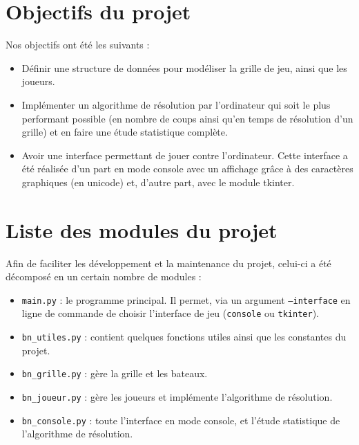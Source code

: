 \section{Objectifs du projet}
Nos objectifs ont été les suivants :
\begin{itemize}
\item Définir une structure de données pour modéliser la grille de jeu, ainsi que les joueurs.
\item Implémenter un algorithme de résolution par l'ordinateur qui soit le plus performant possible (en nombre de coups ainsi qu'en temps de résolution d'un grille) et en faire une étude statistique complète.
\item Avoir une interface permettant de jouer contre l'ordinateur. Cette interface a été réalisée d'un part en mode console avec un affichage grâce à des caractères graphiques (en unicode) et, d'autre part, avec le module tkinter. 
\end{itemize}

\section{Liste des modules du projet}
Afin de faciliter les développement et la maintenance du projet, celui-ci a été décomposé en un certain nombre de modules :
\begin{itemize}
\item \texttt{main.py} : le programme principal. Il permet, via un argument \texttt{--interface} en ligne de commande de choisir l'interface de jeu (\texttt{console} ou \texttt{tkinter}).
\item \texttt{bn\_utiles.py} : contient quelques fonctions utiles ainsi que les constantes du projet.
\item \texttt{bn\_grille.py} : gère la grille et les bateaux.
\item \texttt{bn\_joueur.py} : gère les joueurs et implémente l'algorithme de résolution.
\item \texttt{bn\_console.py} : toute l'interface en mode console, et l'étude statistique de l'algorithme de résolution.
\end{itemize}

